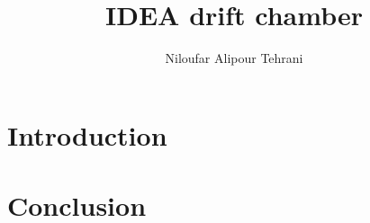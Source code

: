 \documentclass{article}
\begin{document}
\title{IDEA drift chamber}
\author{Niloufar Alipour Tehrani}

\maketitle


\section{Introduction}

\section{Conclusion}
\end{document}
